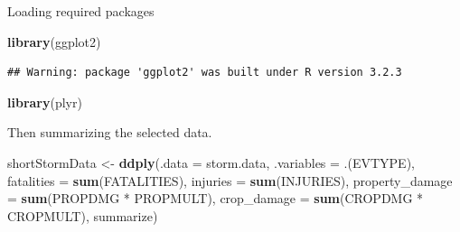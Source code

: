 \documentclass[]{article}
\newenvironment{Shaded}{\begin{snugshade}}{\end{snugshade}}
\newcommand{\KeywordTok}[1]{\textcolor[rgb]{0.13,0.29,0.53}{\textbf{{#1}}}}
\newcommand{\DataTypeTok}[1]{\textcolor[rgb]{0.13,0.29,0.53}{{#1}}}
\newcommand{\DecValTok}[1]{\textcolor[rgb]{0.00,0.00,0.81}{{#1}}}
\newcommand{\StringTok}[1]{\textcolor[rgb]{0.31,0.60,0.02}{{#1}}}
\newcommand{\NormalTok}[1]{{#1}}
\begin{document}
Loading required packages

\begin{Shaded}
\begin{Highlighting}[]
\KeywordTok{library}\NormalTok{(ggplot2)}
\end{Highlighting}
\end{Shaded}

\begin{verbatim}
## Warning: package 'ggplot2' was built under R version 3.2.3
\end{verbatim}

\begin{Shaded}
\begin{Highlighting}[]
\KeywordTok{library}\NormalTok{(plyr)}
\end{Highlighting}
\end{Shaded}

\begin{Shaded}
\end{Shaded}

Then summarizing the selected data.

\begin{Shaded}
\begin{Highlighting}[]
\NormalTok{shortStormData <-}\StringTok{ }\KeywordTok{ddply}\NormalTok{(}\DataTypeTok{.data =} \NormalTok{storm.data, }\DataTypeTok{.variables =} \NormalTok{.(EVTYPE),}
                        \DataTypeTok{fatalities =} \KeywordTok{sum}\NormalTok{(FATALITIES), }
                        \DataTypeTok{injuries =} \KeywordTok{sum}\NormalTok{(INJURIES), }
                        \DataTypeTok{property_damage =} \KeywordTok{sum}\NormalTok{(PROPDMG *}\StringTok{ }\NormalTok{PROPMULT), }
                        \DataTypeTok{crop_damage =} \KeywordTok{sum}\NormalTok{(CROPDMG *}\StringTok{ }\NormalTok{CROPMULT), }
                        \NormalTok{summarize)}
\end{Highlighting}
\end{Shaded}
\end{document}
